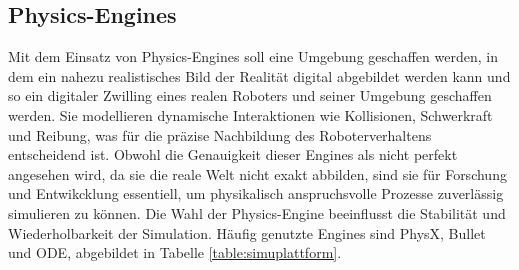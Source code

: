 \subsection{Physics-Engines}
Mit dem Einsatz von {Physics-Engines} soll eine Umgebung geschaffen werden, in
dem ein nahezu realistisches Bild der Realität digital abgebildet werden kann
und so ein digitaler Zwilling eines realen Roboters und seiner Umgebung
geschaffen werden. Sie modellieren dynamische Interaktionen wie Kollisionen,
Schwerkraft und Reibung, was für die präzise Nachbildung des Roboterverhaltens
entscheidend ist. Obwohl die Genauigkeit dieser Engines als nicht perfekt
angesehen wird, da sie die reale Welt nicht exakt abbilden, sind sie für
Forschung und Entwikcklung essentiell, um physikalisch anspruchsvolle Prozesse
zuverlässig simulieren zu können. Die Wahl der Physics-Engine beeinflusst die Stabilität und Wiederholbarkeit der
Simulation. Häufig genutzte Engines sind PhysX, Bullet und ODE, abgebildet in
Tabelle \ref{table:simuplattform}.

